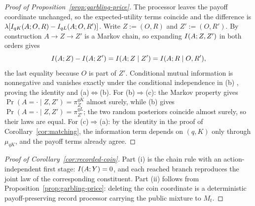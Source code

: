 \begin{proof}[Proof of Proposition~\ref{prop:garbling-price}]
The processor leaves the payoff coordinate unchanged, so the expected-utility terms coincide and the difference is
$\lambda[I_{qK}(A;O,R)-I_{qL}(A;O,R')]$.  Write $Z:=(O,R)$ and $Z':=(O,R')$.  By construction $A\to Z\to Z'$ is
a Markov chain, so expanding $I(A;Z,Z')$ in both orders gives
\[
 I(A;Z)-I(A;Z')=I(A;Z\mid Z')=I(A;R\mid O,R'),
\]
the last equality because $O$ is part of $Z'$.  Conditional mutual information is nonnegative and vanishes exactly
under the conditional independence in \textup{(b)} \cite{CoverThomas2006}, proving the identity and
\textup{(a)}$\Leftrightarrow$\textup{(b)}.  For \textup{(b)}$\Rightarrow$\textup{(c)}: the Markov property gives
$\Pr(A=\cdot\mid Z,Z')=\pi^{qK}_{Z}$ almost surely, while \textup{(b)} gives
$\Pr(A=\cdot\mid Z,Z')=\pi^{qL}_{Z'}$; the two random posteriors coincide almost surely, so their laws are equal.
For \textup{(c)}$\Rightarrow$\textup{(a)}: by the identity in the proof of Corollary~\ref{cor:matching}, the
information term depends on $(q,K)$ only through $\mu_{qK}$, and the payoff terms already agree.
\end{proof}

\begin{proof}[Proof of Corollary~\ref{cor:recorded-coin}]
Part \textup{(i)} is the chain rule with an action-independent first stage:
$I(A;Y)=0$, and each reached branch reproduces the joint law of the
corresponding constituent.  Part \textup{(ii)} follows from
Proposition~\ref{prop:garbling-price}: deleting the coin coordinate is a
deterministic payoff-preserving record processor carrying the public mixture
to $M_t$.
\end{proof}

